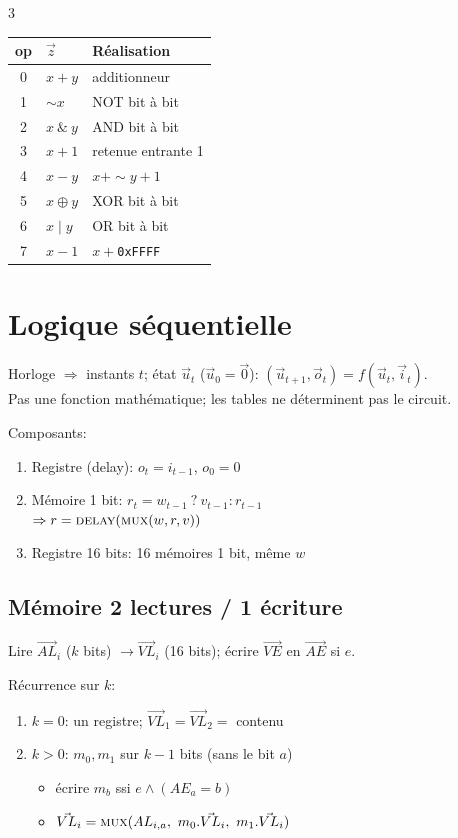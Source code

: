 \documentclass[12pt, a4paper]{article}
\begin{document}
\begin{multicols*}{3}
	\begin{tabular}{|c|l|l|}
		\hline
		\textbf{op} & $\vec{z}$      & \textbf{Réalisation}    \\
		\hline
		0           & $x+y$          & additionneur            \\
		1           & $\sim x$       & NOT bit à bit           \\
		2           & $x\ \&\ y$     & AND bit à bit           \\
		3           & $x+1$          & retenue entrante 1      \\
		4           & $x-y$          & $x+\sim y+1$            \\
		5           & $x\oplus y$    & XOR bit à bit           \\
		6           & $x\mid y$      & OR bit à bit            \\
		7           & $x-1$          & $x+$\texttt{0xFFFF}     \\
		\hline
	\end{tabular}
 
	\colbreak
	\section{Logique séquentielle}
	Horloge $\Rightarrow$ instants $t$; état $\vec{u}_t$ ($\vec{u}_0=\vec{0}$): $(\vec{u}_{t+1},\vec{o}_t)=f(\vec{u}_t,\vec{i}_t)$.\\
	Pas une fonction mathématique; les tables ne déterminent pas le circuit.
 
	Composants:
	\begin{enumerate}[\roman*.]
		\item Registre (delay): $o_t=i_{t-1}$, $o_0=0$
		\item Mémoire 1 bit: $r_t=w_{t-1}\ ?\ v_{t-1}:r_{t-1}$\\$\Rightarrow r=\textsc{delay}(\textsc{mux}(w,r,v))$
		\item Registre 16 bits: 16 mémoires 1 bit, même $w$
	\end{enumerate}
 
	\subsection{Mémoire 2 lectures / 1 écriture}
	Lire $\vec{AL}_i$ ($k$ bits) $\rightarrow\vec{VL}_i$ (16 bits); écrire $\vec{VE}$ en $\vec{AE}$ si $e$.
 
	Récurrence sur $k$:
	\begin{enumerate}[\roman*.]
		\item $k=0$: un registre; $\vec{VL}_1=\vec{VL}_2=$ contenu
		\item $k>0$: $m_0,m_1$ sur $k-1$ bits (sans le bit $a$)
		\begin{itemize}
			\item écrire $m_b$ ssi $e\land(AE_a=b)$
			\item $\vec{VL}_i=\textsc{mux}(AL_{i,a},\ m_0.\vec{VL}_i,\ m_1.\vec{VL}_i)$
		\end{itemize}
	\end{enumerate}
 

\end{multicols*}
\end{document}

